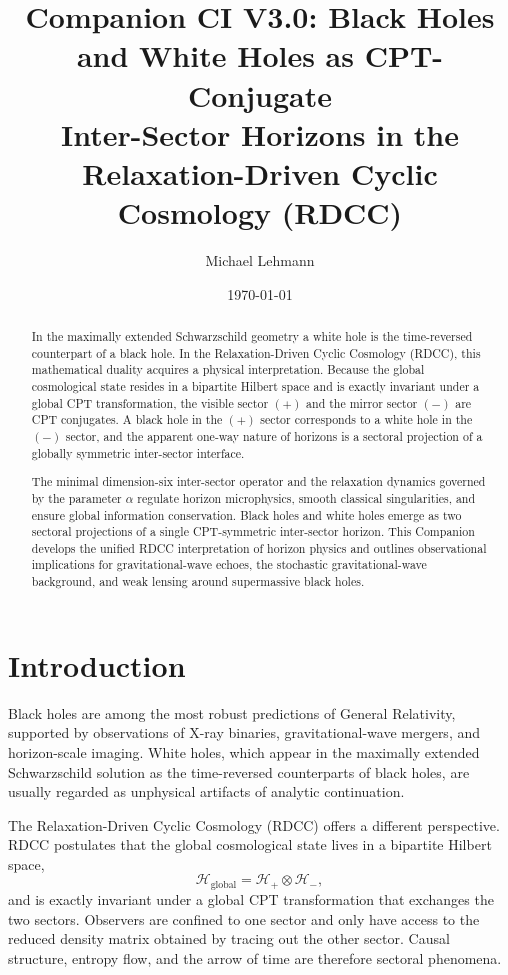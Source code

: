 \documentclass[11pt,a4paper]{article}
\title{\textbf{Companion CI V3.0: Black Holes and White Holes as CPT-Conjugate\\
Inter-Sector Horizons in the Relaxation-Driven Cyclic Cosmology (RDCC)}}
\author[1]{Michael Lehmann}
\affil[1]{\small Independent Researcher, Relaxation-Driven Cyclic Cosmology (RDCC) Framework\\
\texttt{mi.lehmann@gmx.de}}
\date{\small \today}
\begin{document}
\maketitle


\begin{abstract}
In the maximally extended Schwarzschild geometry a white hole is the time-reversed
counterpart of a black hole. In the Relaxation-Driven Cyclic Cosmology (RDCC), this
mathematical duality acquires a physical interpretation. Because the global cosmological
state resides in a bipartite Hilbert space and is exactly invariant under a global CPT
transformation, the visible sector $(+)$ and the mirror sector $(-)$ are CPT conjugates.
A black hole in the $(+)$ sector corresponds to a white hole in the $(-)$ sector, and the
apparent one-way nature of horizons is a sectoral projection of a globally symmetric
inter-sector interface.

The minimal dimension-six inter-sector operator and the relaxation dynamics governed
by the parameter $\alpha$ regulate horizon microphysics, smooth classical singularities,
and ensure global information conservation. Black holes and white holes emerge as two
sectoral projections of a single CPT-symmetric inter-sector horizon. This Companion
develops the unified RDCC interpretation of horizon physics and outlines observational
implications for gravitational-wave echoes, the stochastic gravitational-wave background,
and weak lensing around supermassive black holes.
\end{abstract}


\section{Introduction}

Black holes are among the most robust predictions of General Relativity, supported by
observations of X-ray binaries, gravitational-wave mergers, and horizon-scale imaging.
White holes, which appear in the maximally extended Schwarzschild solution as the
time-reversed counterparts of black holes, are usually regarded as unphysical artifacts of
analytic continuation.

The Relaxation-Driven Cyclic Cosmology (RDCC) offers a different perspective. RDCC
postulates that the global cosmological state lives in a bipartite Hilbert space,
\begin{equation}
\mathcal{H}_{\mathrm{global}} = \mathcal{H}_{+} \otimes \mathcal{H}_{-},
\end{equation}
and is exactly invariant under a global CPT transformation that exchanges the two
sectors. Observers are confined to one sector and only have access to the reduced density
matrix obtained by tracing out the other sector. Causal structure, entropy flow, and the
arrow of time are therefore sectoral phenomena.
\end{document}
